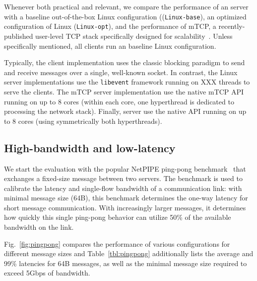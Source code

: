 
Whenever both practical and relevant, we compare the performance of an
\ix server with a baseline out-of-the-box Linux configuration
((\texttt{Linux-base}), an optimized configuration of Linux
(\texttt{Linux-opt}), and the performance of mTCP, a
recently-published user-level TCP stack specifically designed for
scalability~\cite{jeong2014mtcp}.  Unless specifically mentioned, all
clients run an baseline Linux configuration.  

Typically, the client implementation uses the classic blocking
paradigm to send and receive messages over a single, well-known
socket.  In contrast, the Linux server implementations use the
\texttt{libevent} framework running on XXX threads to serve the
clients. The mTCP server implementation use the native mTCP API
running on up to 8 cores (within each core, one hyperthread is
dedicated to processing the network stack).  Finally, \ix server use
the native \ix API running on up to 8 cores (using symmetrically both
hyperthreads).


\subsection{High-bandwidth and low-latency}
\label{sec:eval:netpipe}




We start the evaluation with the popular NetPIPE ping-pong
benchmark~\cite{snell1996netpipe} that exchanges a fixed-size message
between two servers.  The benchmark is used to calibrate the latency
and single-flow bandwidth of a communication link: with minimal
message size (64B), this benchmark determines the one-way latency for
short message communication.  With increasingly larger messages, it
determines how quickly this single ping-pong behavior can utilize 50\%
of the available bandwidth on the link.

Fig.~\ref{fig:pingpong} compares the performance of various
configurations for different message sizes and Table~\ref{tbl:pingpong}
additionally lists the average and 99\% latencies for 64B messages, as
well as the minimal message size required to exceed 5Gbps of
bandwidth.

